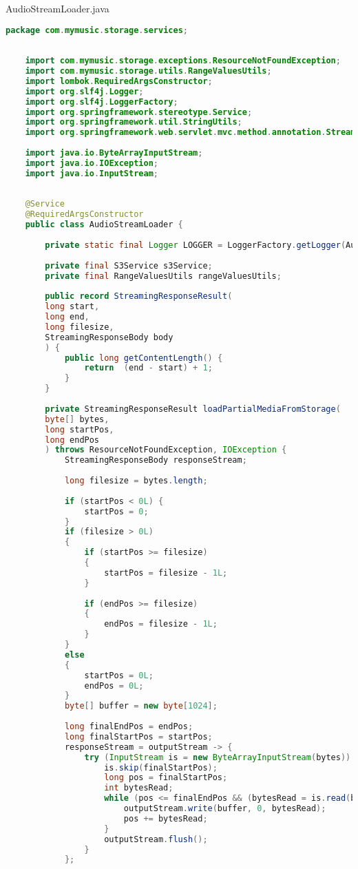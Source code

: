 AudioStreamLoader.java
\begin{lstlisting}[language=java]
	package com.mymusic.storage.services;
	
	
	import com.mymusic.storage.exceptions.ResourceNotFoundException;
	import com.mymusic.storage.utils.RangeValuesUtils;
	import lombok.RequiredArgsConstructor;
	import org.slf4j.Logger;
	import org.slf4j.LoggerFactory;
	import org.springframework.stereotype.Service;
	import org.springframework.util.StringUtils;
	import org.springframework.web.servlet.mvc.method.annotation.StreamingResponseBody;
	
	import java.io.ByteArrayInputStream;
	import java.io.IOException;
	import java.io.InputStream;
	
	
	@Service
	@RequiredArgsConstructor
	public class AudioStreamLoader {
		
		private static final Logger LOGGER = LoggerFactory.getLogger(AudioStreamLoader.class);
		
		private final S3Service s3Service;
		private final RangeValuesUtils rangeValuesUtils;
		
		public record StreamingResponseResult(
		long start,
		long end,
		long filesize,
		StreamingResponseBody body
		) {
			public long getContentLength() {
				return  (end - start) + 1;
			}
		}
		
		private StreamingResponseResult loadPartialMediaFromStorage(
		byte[] bytes,
		long startPos,
		long endPos
		) throws ResourceNotFoundException, IOException {
			StreamingResponseBody responseStream;
			
			long filesize = bytes.length;
			
			if (startPos < 0L) {
				startPos = 0;
			}
			if (filesize > 0L)
			{
				if (startPos >= filesize)
				{
					startPos = filesize - 1L;
				}
				
				if (endPos >= filesize)
				{
					endPos = filesize - 1L;
				}
			}
			else
			{
				startPos = 0L;
				endPos = 0L;
			}
			byte[] buffer = new byte[1024];
			
			long finalEndPos = endPos;
			long finalStartPos = startPos;
			responseStream = outputStream -> {
				try (InputStream is = new ByteArrayInputStream(bytes)) {
					is.skip(finalStartPos);
					long pos = finalStartPos;
					int bytesRead;
					while (pos <= finalEndPos && (bytesRead = is.read(buffer, 0, (int) Math.min(buffer.length, finalEndPos - pos + 1))) != -1) {
						outputStream.write(buffer, 0, bytesRead);
						pos += bytesRead;
					}
					outputStream.flush();
				}
			};
			

\end{lstlisting}
